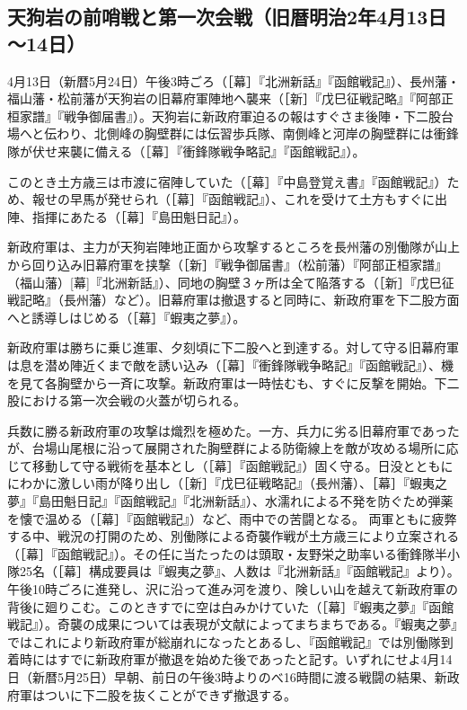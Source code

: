 \documentclass[11pt,report]{jsarticle}
\begin{document}
\subsection{天狗岩の前哨戦と第一次会戦（旧暦明治2年4月13日～14日）}
4月13日（新暦5月24日）午後3時ごろ（［幕］『北洲新話』『函館戦記』）、長州藩・福山藩・松前藩が天狗岩の旧幕府軍陣地へ襲来（［新］『戊巳征戦記略』『阿部正桓家譜』『戦争御届書』）。天狗岩に新政府軍迫るの報はすぐさま後陣・下二股台場へと伝わり、北側峰の胸壁群には伝習歩兵隊、南側峰と河岸の胸壁群には衝鋒隊が伏せ来襲に備える（［幕］『衝鋒隊戦争略記』『函館戦記』）。

このとき土方歳三は市渡に宿陣していた（［幕］『中島登覚え書』『函館戦記』）ため、報せの早馬が発せられ（［幕］『函館戦記』）、これを受けて土方もすぐに出陣、指揮にあたる（［幕］『島田魁日記』）。

新政府軍は、主力が天狗岩陣地正面から攻撃するところを長州藩の別働隊が山上から回り込み旧幕府軍を挟撃（［新］『戦争御届書』（松前藩）『阿部正桓家譜』（福山藩）[幕]『北洲新話』）、同地の胸壁３ヶ所は全て陥落する（［新］『戊巳征戦記略』（長州藩）など）。旧幕府軍は撤退すると同時に、新政府軍を下二股方面へと誘導しはじめる（［幕］『蝦夷之夢』）。

新政府軍は勝ちに乗じ進軍、夕刻頃に下二股へと到達する。対して守る旧幕府軍は息を潜め陣近くまで敵を誘い込み（［幕］『衝鋒隊戦争略記』『函館戦記』）、機を見て各胸壁から一斉に攻撃。新政府軍は一時怯むも、すぐに反撃を開始。下二股における第一次会戦の火蓋が切られる。

兵数に勝る新政府軍の攻撃は熾烈を極めた。一方、兵力に劣る旧幕府軍であったが、台場山尾根に沿って展開された胸壁群による防衛線上を敵が攻める場所に応じて移動して守る戦術を基本とし（［幕］『函館戦記』）固く守る。日没とともににわかに激しい雨が降り出し（［新］『戊巳征戦略記』（長州藩）、［幕］『蝦夷之夢』『島田魁日記』『函館戦記』『北洲新話』）、水濡れによる不発を防ぐため弾薬を懐で温める（［幕］『函館戦記』）など、雨中での苦闘となる。
両軍ともに疲弊する中、戦況の打開のため、別働隊による奇襲作戦が土方歳三により立案される（［幕］『函館戦記』）。その任に当たったのは頭取・友野栄之助率いる衝鋒隊半小隊25名（［幕］構成要員は『蝦夷之夢』、人数は『北洲新話』『函館戦記』より）。午後10時ごろに進発し、沢に沿って進み河を渡り、険しい山を越えて新政府軍の背後に廻りこむ。このときすでに空は白みかけていた（［幕］『蝦夷之夢』『函館戦記』）。奇襲の成果については表現が文献によってまちまちである。『蝦夷之夢』ではこれにより新政府軍が総崩れになったとあるし、『函館戦記』では別働隊到着時にはすでに新政府軍が撤退を始めた後であったと記す。いずれにせよ4月14日（新暦5月25日）早朝、前日の午後3時よりのべ16時間に渡る戦闘の結果、新政府軍はついに下二股を抜くことができず撤退する。
\end{document}
